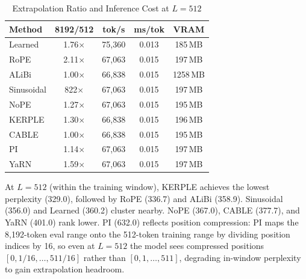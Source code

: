 \documentclass[conference]{IEEEtran}
\begin{document}
\begin{table}[!t]
\caption{Extrapolation Ratio and Inference Cost at $L{=}512$}
\label{tab:cost}
\centering
\scriptsize
\begin{tabular*}{\columnwidth}{@{\extracolsep{\fill}}lcccc}
\hline
\textbf{Method} & \textbf{8192/512} & \textbf{tok/s} & \textbf{ms/tok} & \textbf{VRAM} \\
\hline
Learned & 1.76$\times$ & 75{,}360 & 0.013 & 185\,MB \\
RoPE & 2.11$\times$ & 67{,}063 & 0.015 & 197\,MB \\
ALiBi & 1.00$\times$ & 66{,}838 & 0.015 & 1258\,MB \\
Sinusoidal & 822$\times$ & 67{,}063 & 0.015 & 197\,MB \\
NoPE & 1.27$\times$ & 67{,}063 & 0.015 & 195\,MB \\
KERPLE & 1.30$\times$ & 66{,}838 & 0.015 & 196\,MB \\
CABLE & 1.00$\times$ & 66{,}838 & 0.015 & 195\,MB \\
PI & 1.14$\times$ & 67{,}063 & 0.015 & 197\,MB \\
YaRN & 1.59$\times$ & 67{,}063 & 0.015 & 197\,MB \\
\hline
\end{tabular*}
\end{table}

At $L{=}512$ (within the training window), KERPLE achieves the lowest perplexity (329.0), followed by RoPE (336.7) and ALiBi (358.9). Sinusoidal (356.0) and Learned (360.2) cluster nearby. NoPE (367.0), CABLE (377.7), and YaRN (401.0) rank lower. PI (632.0) reflects position compression: PI maps the 8,192-token eval range onto the 512-token training range by dividing position indices by 16, so even at $L{=}512$ the model sees compressed positions $[0, 1/16, \ldots, 511/16]$ rather than $[0, 1, \ldots, 511]$, degrading in-window perplexity to gain extrapolation headroom.
\end{document}
